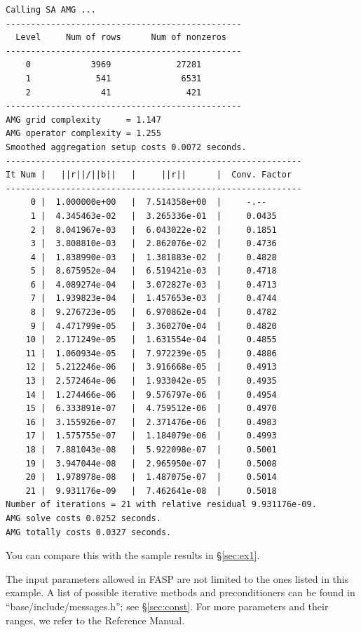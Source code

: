 \documentclass[11pt]{memoir}
\begin{document}
\begin{lstlisting}[numbers=none]
Calling SA AMG ...
-----------------------------------------------
  Level     Num of rows      Num of nonzeros
-----------------------------------------------
    0            3969             27281
    1             541              6531
    2              41               421
-----------------------------------------------
AMG grid complexity     = 1.147
AMG operator complexity = 1.255
Smoothed aggregation setup costs 0.0072 seconds.
-----------------------------------------------------------
It Num |   ||r||/||b||   |     ||r||      |  Conv. Factor
-----------------------------------------------------------
     0 |  1.000000e+00   |  7.514358e+00  |     -.--
     1 |  4.345463e-02   |  3.265336e-01  |     0.0435
     2 |  8.041967e-03   |  6.043022e-02  |     0.1851
     3 |  3.808810e-03   |  2.862076e-02  |     0.4736
     4 |  1.838990e-03   |  1.381883e-02  |     0.4828
     5 |  8.675952e-04   |  6.519421e-03  |     0.4718
     6 |  4.089274e-04   |  3.072827e-03  |     0.4713
     7 |  1.939823e-04   |  1.457653e-03  |     0.4744
     8 |  9.276723e-05   |  6.970862e-04  |     0.4782
     9 |  4.471799e-05   |  3.360270e-04  |     0.4820
    10 |  2.171249e-05   |  1.631554e-04  |     0.4855
    11 |  1.060934e-05   |  7.972239e-05  |     0.4886
    12 |  5.212246e-06   |  3.916668e-05  |     0.4913
    13 |  2.572464e-06   |  1.933042e-05  |     0.4935
    14 |  1.274466e-06   |  9.576797e-06  |     0.4954
    15 |  6.333891e-07   |  4.759512e-06  |     0.4970
    16 |  3.155926e-07   |  2.371476e-06  |     0.4983
    17 |  1.575755e-07   |  1.184079e-06  |     0.4993
    18 |  7.881043e-08   |  5.922098e-07  |     0.5001
    19 |  3.947044e-08   |  2.965950e-07  |     0.5008
    20 |  1.978978e-08   |  1.487075e-07  |     0.5014
    21 |  9.931176e-09   |  7.462641e-08  |     0.5018
Number of iterations = 21 with relative residual 9.931176e-09.
AMG solve costs 0.0252 seconds.
AMG totally costs 0.0327 seconds.
\end{lstlisting}
%
You can compare this with the sample results in \S\ref{sec:ex1}.

\begin{snugshade}\noindent
The input parameters allowed in FASP are not limited to the ones listed in this example. A list of possible iterative methods and preconditioners can be found in ``base/include/messages.h''; see \S\ref{sec:const}. For more parameters and their ranges, we refer to the Reference Manual.
\end{snugshade}

\end{document}
